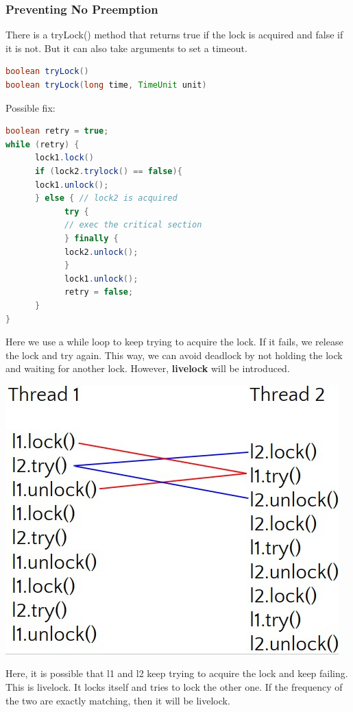 \documentclass[letterpaper,12pt]{article}
\begin{document}
\subsubsection{Preventing No Preemption}
There is a tryLock() method that returns true if the lock is acquired and false if it is not. But it can also take arguments to set a timeout.
\begin{lstlisting}[language=Java]
boolean tryLock() 
boolean tryLock(long time, TimeUnit unit) 
\end{lstlisting}
Possible fix:\begin{lstlisting}[language=Java]
boolean retry = true;
while (retry) {
      lock1.lock()
      if (lock2.trylock() == false){ 
      lock1.unlock(); 
      } else { // lock2 is acquired
            try {
            // exec the critical section
            } finally {
            lock2.unlock();
            }
            lock1.unlock();
            retry = false;
      }
}
\end{lstlisting}
Here we use a while loop to keep trying to acquire the lock. If it fails, we release the lock and try again. This way, we can avoid deadlock by not holding the lock and waiting for another lock. However, \textbf{livelock} will be introduced.

\includegraphics*[scale=0.5]{./summary_image/Livelock.jpg}

Here, it is possible that l1 and l2 keep trying to acquire the lock and keep failing. This is livelock. It locks itself and tries to lock the other one. If the frequency of the two are exactly matching, then it will be livelock.
\end{document}
